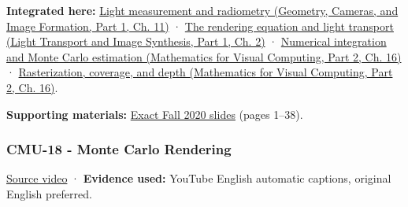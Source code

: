 \textbf{Integrated here:} \href{../03-Geometry-Cameras-and-Image-Formation-P01/main.pdf\#nameddest=03-visual-computing-i-ch004-light-measurement-and-radiometry}{Light measurement and radiometry (Geometry, Cameras, and Image Formation, Part 1, Ch. 11)} · \href{../04-Light-Transport-and-Image-Synthesis-P01/main.pdf\#nameddest=03-visual-computing-i-ch007-the-rendering-equation-and-light-transport}{The rendering equation and light transport (Light Transport and Image Synthesis, Part 1, Ch. 2)} · \href{../02-Mathematics-for-Visual-Computing-P02/main.pdf\#nameddest=03-visual-computing-i-ch012-numerical-integration-and-monte-carlo-estimation}{Numerical integration and Monte Carlo estimation (Mathematics for Visual Computing, Part 2, Ch. 16)} · \href{../02-Mathematics-for-Visual-Computing-P02/main.pdf\#nameddest=03-visual-computing-i-ch012-rasterization-coverage-and-depth}{Rasterization, coverage, and depth (Mathematics for Visual Computing, Part 2, Ch. 16)}.

\textbf{Supporting materials:} \href{https://15462.courses.cs.cmu.edu/fall2020content/lectures/17_numericalintegration/17_numericalintegration_slides.pdf}{Exact Fall 2020 slides} (pages 1--38).

\subsubsection{CMU-18 - Monte Carlo Rendering}\label{04-visual-computing-ii-ch036-cmu-18---monte-carlo-rendering}

\hypertarget{04-visual-computing-ii-ch036-cmu-18---monte-carlo-rendering}{}

\href{https://www.youtube.com/watch?v=FUZJNlRqrAc}{Source video} · \textbf{Evidence used:} YouTube English automatic captions, original English preferred.


